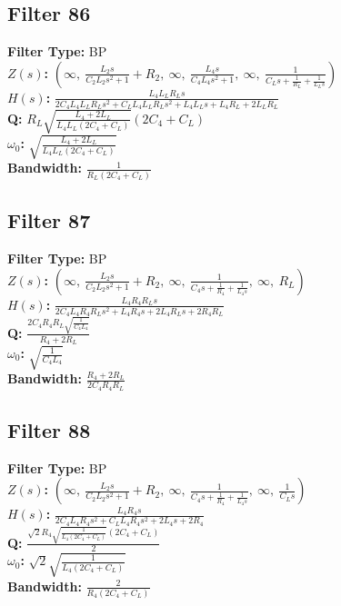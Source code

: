 \documentclass{article}
\begin{document}
\subsection*{Filter 86}
\textbf{Filter Type:} BP \\ 
\textbf{$Z(s)$:} $\left( \infty, \  \frac{L_{2} s}{C_{2} L_{2} s^{2} + 1} + R_{2}, \  \infty, \  \frac{L_{4} s}{C_{4} L_{4} s^{2} + 1}, \  \infty, \  \frac{1}{C_{L} s + \frac{1}{R_{L}} + \frac{1}{L_{L} s}}\right)$ \\ 
\textbf{$H(s)$:} $\frac{L_{4} L_{L} R_{L} s}{2 C_{4} L_{4} L_{L} R_{L} s^{2} + C_{L} L_{4} L_{L} R_{L} s^{2} + L_{4} L_{L} s + L_{4} R_{L} + 2 L_{L} R_{L}}$ \\ 
\textbf{Q:} $R_{L} \sqrt{\frac{L_{4} + 2 L_{L}}{L_{4} L_{L} \left(2 C_{4} + C_{L}\right)}} \left(2 C_{4} + C_{L}\right)$ \\ 
\textbf{$\omega_0$:} $\sqrt{\frac{L_{4} + 2 L_{L}}{L_{4} L_{L} \left(2 C_{4} + C_{L}\right)}}$ \\ 
\textbf{Bandwidth:} $\frac{1}{R_{L} \left(2 C_{4} + C_{L}\right)}$ \\ 
\subsection*{Filter 87}
\textbf{Filter Type:} BP \\ 
\textbf{$Z(s)$:} $\left( \infty, \  \frac{L_{2} s}{C_{2} L_{2} s^{2} + 1} + R_{2}, \  \infty, \  \frac{1}{C_{4} s + \frac{1}{R_{4}} + \frac{1}{L_{4} s}}, \  \infty, \  R_{L}\right)$ \\ 
\textbf{$H(s)$:} $\frac{L_{4} R_{4} R_{L} s}{2 C_{4} L_{4} R_{4} R_{L} s^{2} + L_{4} R_{4} s + 2 L_{4} R_{L} s + 2 R_{4} R_{L}}$ \\ 
\textbf{Q:} $\frac{2 C_{4} R_{4} R_{L} \sqrt{\frac{1}{C_{4} L_{4}}}}{R_{4} + 2 R_{L}}$ \\ 
\textbf{$\omega_0$:} $\sqrt{\frac{1}{C_{4} L_{4}}}$ \\ 
\textbf{Bandwidth:} $\frac{R_{4} + 2 R_{L}}{2 C_{4} R_{4} R_{L}}$ \\ 
\subsection*{Filter 88}
\textbf{Filter Type:} BP \\ 
\textbf{$Z(s)$:} $\left( \infty, \  \frac{L_{2} s}{C_{2} L_{2} s^{2} + 1} + R_{2}, \  \infty, \  \frac{1}{C_{4} s + \frac{1}{R_{4}} + \frac{1}{L_{4} s}}, \  \infty, \  \frac{1}{C_{L} s}\right)$ \\ 
\textbf{$H(s)$:} $\frac{L_{4} R_{4} s}{2 C_{4} L_{4} R_{4} s^{2} + C_{L} L_{4} R_{4} s^{2} + 2 L_{4} s + 2 R_{4}}$ \\ 
\textbf{Q:} $\frac{\sqrt{2} R_{4} \sqrt{\frac{1}{L_{4} \left(2 C_{4} + C_{L}\right)}} \left(2 C_{4} + C_{L}\right)}{2}$ \\ 
\textbf{$\omega_0$:} $\sqrt{2} \sqrt{\frac{1}{L_{4} \left(2 C_{4} + C_{L}\right)}}$ \\ 
\textbf{Bandwidth:} $\frac{2}{R_{4} \left(2 C_{4} + C_{L}\right)}$ \\ 
\end{document}

